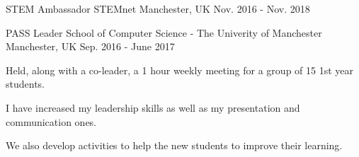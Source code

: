 \begin{cventries}

  \cventry
    {STEM Ambassador}
    {STEMnet}
    {Manchester, UK}
    {Nov. 2016 - Nov. 2018}
    {
    }

  \cventry
    {PASS Leader}
    {School of Computer Science - The Univerity of Manchester}
    {Manchester, UK}
    {Sep. 2016 - June 2017}
    {
      \begin{cvitems}
        \item {Held, along with a co-leader, a 1 hour weekly meeting for a group of 15 1st year students.}
        \item {I have increased my leadership skills as well as my presentation and communication ones.}
        \item {We also develop activities to help the new students to improve their learning.}
      \end{cvitems}
    }


\end{cventries}
